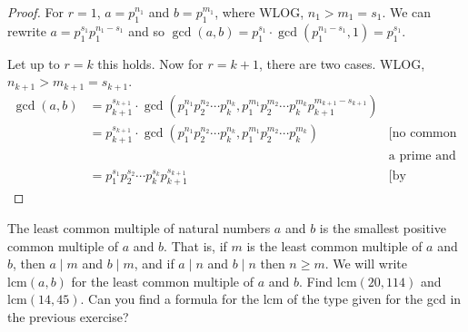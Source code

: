 \documentclass[12pt]{article}
\newenvironment{exercise}[2][Exercise]{\begin{trivlist}
\item[\hskip \labelsep {\bfseries #1}\hskip \labelsep {\bfseries #2.}]}{\end{trivlist}}
\begin{document}
\begin{proof}
	For $r=1$, $a=p_1^{n_1}$ and $b=p_1^{m_1}$, where WLOG, $n_1 > m_1=s_1$. We can rewrite $a=p_1^{s_1}p_1^{n_1-s_1}$ and so $\gcd(a,b)=p_1^{s_1}\cdot \gcd(p_1^{n_1-s_1}, 1)=p_1^{s_1}$.

	Let up to $r=k$ this holds. Now for $r=k+1$, there are two cases. WLOG, $n_{k+1}>m_{k+1}=s_{k+1}$.
	\begin{align*}
		\gcd(a,b)                                                       & = p_{k+1}^{s_{k+1}} \cdot \gcd(p_1^{n_1} p_2^{n_2} \cdots p_k^{n_k},
		p_1^{m_1} p_2^{m_2} \cdots p_k^{m_k} p_{k+1}^{m_{k+1}-s_{k+1}}) &                                                                                                                                                           \\
		                                                                & = p_{k+1}^{s_{k+1}} \cdot \gcd(p_1^{n_1} p_2^{n_2} \cdots p_k^{n_k},    p_1^{m_1} p_2^{m_2} \cdots p_k^{m_k}) & \text{[no common divisor exists between } \\
		                                                                &                                                                                                               & \text{a prime and other primes.]}         \\
		                                                                & = p_1^{s_1} p_2^{s_2} \cdots p_k^{s_k} p_{k+1}^{s_{k+1}}                                                      & \text{[by induction hypothesis.]}
	\end{align*}
\end{proof}

\begin{exercise}{11}
	The least common multiple of natural numbers \(a\) and \(b\) is the smallest positive common multiple of \(a\) and \(b\). That is, if \(m\) is the least common multiple of \(a\) and \(b\), then \(a \mid m\) and \(b \mid m\), and if \(a \mid n\) and \(b \mid n\) then \(n \geq m\). We will write \(\text{lcm}(a, b)\) for the least common multiple of \(a\) and \(b\). Find \(\text{lcm}(20, 114)\) and \(\text{lcm}(14, 45)\). Can you find a formula for the lcm of the type given for the gcd in the previous exercise?
\end{exercise}
\end{document}
